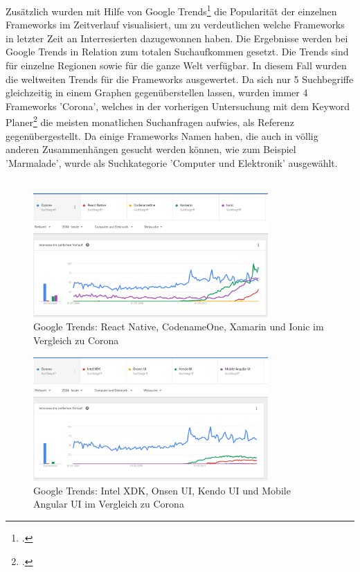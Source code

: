 \clearpage
Zusätzlich wurden mit Hilfe von Google Trends\footcite{GoogleTrends} die Popularität der einzelnen Frameworks im Zeitverlauf visualisiert, um zu verdeutlichen welche Frameworks in letzter Zeit an Interresierten dazugewonnen haben. Die Ergebnisse werden bei Google Trends in Relation zum totalen Suchaufkommen gesetzt. Die Trends sind für einzelne Regionen sowie für die ganze Welt verfügbar. In diesem Fall wurden die weltweiten Trends für die Frameworks ausgewertet. Da sich nur 5 Suchbegriffe gleichzeitig in einem Graphen gegenüberstellen lassen, wurden immer 4 Frameworks 'Corona', welches in der vorherigen Untersuchung mit dem Keyword Planer\footcite{KeyWordPlaner} die meisten monatlichen Suchanfragen aufwies, als Referenz gegenübergestellt. Da einige Frameworks Namen haben, die auch in völlig anderen Zusammenhängen gesucht werden können, wie zum Beispiel 'Marmalade', wurde als Suchkategorie 'Computer und Elektronik' ausgewählt.
\\
\\
\begin{figure}[h]
	\centering
	\includegraphics[width=0.8\textwidth]{Bilder/trends_1.PNG}
	\caption{Google Trends: React Native, CodenameOne, Xamarin und Ionic im Vergleich zu Corona}
	\label{fig:Trends1}
\end{figure}
\begin{figure}[h]
	\centering
	\includegraphics[width=0.8\textwidth]{Bilder/trends_2.PNG}
	\caption{Google Trends: Intel XDK, Onsen UI, Kendo UI und Mobile Angular UI im Vergleich zu Corona}
	\label{fig:Trends2}
\end{figure}
